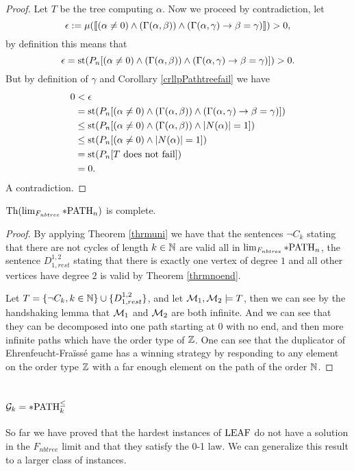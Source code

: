 \begin{proof}
Let $T$ be the tree computing $\alpha$. Now we proceed by contradiction, let
\[\epsilon:=\mu(\llbracket(\alpha\not=0)\land (\Gamma(\alpha,\beta)) \land(\Gamma(\alpha,\gamma) \to \beta=\gamma)\rrbracket)>0,\]
by definition this means that
\[\epsilon=\text{st}(P_n[(\alpha\not=0)\land (\Gamma(\alpha,\beta)) \land(\Gamma(\alpha,\gamma) \to \beta=\gamma)])>0.\]
But by definition of $\gamma$ and Corollary \ref{crllpPathtreefail} we have
\begin{align*}
0&<\epsilon\\
&=\text{st}(P_n[(\alpha\not=0)\land (\Gamma(\alpha,\beta)) \land(\Gamma(\alpha,\gamma) \to \beta=\gamma)])\\
&\leq\text{st}(P_n[(\alpha\not=0)\land (\Gamma(\alpha,\beta)) \land \left|{N(\alpha)}\right|=1])\\
&\leq\text{st}(P_n[(\alpha\not=0)\land \left|{N(\alpha)}\right|=1])\\
&=\text{st}(P_n[T\text{ does not fail}])\\
&=0.
\end{align*}
A contradiction.
\end{proof}

\begin{crll}\label{crllpPATH}
$\text{Th}(\lim_{F_{nbtree}}*\text{PATH}_n)$ is complete.
\end{crll}
\begin{proof}
By applying Theorem \ref{thrmuni} we have that the sentences $\lnot C_k$ stating that there are not cycles of length $k\in\mathbb{N}$ are valid all in $\lim_{F_{nbtree}}*\text{PATH}_n$, the sentence $D^{1,2}_{1,rest}$ stating that there is exactly one vertex of degree $1$ and all other vertices have degree $2$ is valid by Theorem \ref{thrmnoend}. 

Let $T=\{\lnot C_k,k\in\mathbb{N}\}\cup\{D_{1,rest}^{1,2}\}$, and let $\mathcal{M}_1,\mathcal{M}_2\models T$, then we can see by the handshaking lemma that $\mathcal{M}_1$ and $\mathcal{M}_2$ are both infinite. And we can see that they can be decomposed into one path starting at $0$ with no end, and then more infinite paths which have the order type of $\mathbb{Z}$. One can see that the duplicator of Ehrenfeucht-Fraïssé game has a winning strategy by responding to any element on the order type $\mathbb{Z}$ with a far enough element on the path of the order $\mathbb{N}$.
\end{proof}

\section{$\mathcal{G}_k=*\text{PATH}^\leq_k$}

So far we have proved that the hardest instances of $\text{LEAF}$ do not have a solution in the $F_{nbtree}$ limit and that they satisfy the 0-1 law. We can generalize this result to a larger class of instances.

